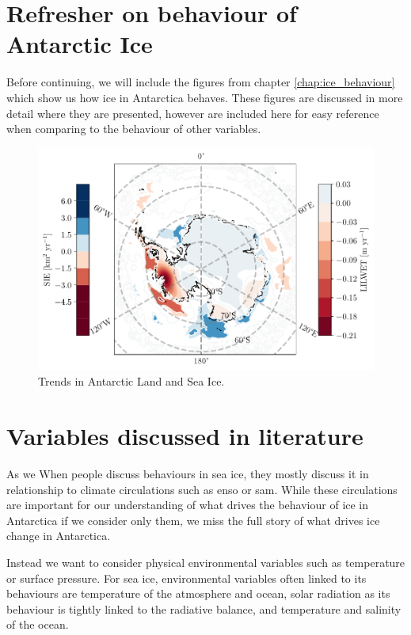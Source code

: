 \documentclass[../main.tex]{subfiles}
\begin{document}
\section{Refresher on behaviour of Antarctic Ice}
Before continuing, we will include the figures from chapter \ref{chap:ice_behaviour} which show us how ice in Antarctica behaves. These figures are discussed in more detail where they are presented, however are included here for easy reference when comparing to the behaviour of other variables.
\begin{figure}[hbt!]
    \centering
    \includegraphics{images/T2/individually_made/hres/combined_ice_trend_005}
    \caption{Trends in Antarctic Land and Sea Ice.}
    \label{fig:combined_ice_trend_0}
\end{figure}

\section{Variables discussed in literature}
As we When people discuss behaviours in sea ice, they mostly discuss it in relationship to climate circulations such as \gls{enso} or \gls{sam}. While these circulations are important for our understanding of what drives the behaviour of ice in Antarctica if we consider only them, we miss the full story of what drives ice change in Antarctica. 

Instead we want to consider physical environmental variables such as temperature or surface pressure. For sea ice, environmental variables often linked to its behaviours are temperature of the atmosphere and ocean, solar radiation as its behaviour is tightly linked to the radiative balance, and temperature and salinity of the ocean. 
\end{document}
